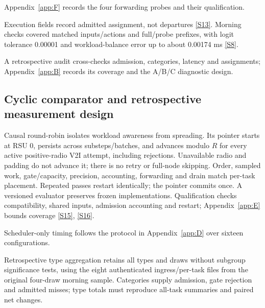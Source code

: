 \documentclass[12pt,a4paper]{article}
\begin{document}
Appendix~\ref{app:F} records the four forwarding probes and their qualification.

Execution fields record admitted assignment, not departures \hyperref[source-s13]{[S13]}. Morning checks covered matched inputs/actions and full/probe prefixes, with logit tolerance 0.00001 and workload-balance error up to about 0.00174 ms \hyperref[source-s8]{[S8]}.

A retrospective audit cross-checks admission, categories, latency and assignments; Appendix~\ref{app:B} records its coverage and the A/B/C diagnostic design.

\FloatBarrier
\subsection{Cyclic comparator and retrospective measurement design}\label{sec:2.8}

Causal round-robin isolates workload awareness from spreading. Its pointer starts at RSU 0, persists across substeps/batches, and advances modulo $R$ for every active positive-radio V2I attempt, including rejections. Unavailable radio and padding do not advance it; there is no retry or full-node skipping. Order, sampled work, gate/capacity, precision, accounting, forwarding and drain match per-task placement. Repeated passes restart identically; the pointer commits once. A versioned evaluator preserves frozen implementations. Qualification checks compatibility, shared inputs, admission accounting and restart; Appendix~\ref{app:E} bounds coverage \hyperref[source-s15]{[S15]}, \hyperref[source-s16]{[S16]}.

Scheduler-only timing follows the protocol in Appendix~\ref{app:D} over sixteen configurations.

Retrospective type aggregation retains all types and draws without subgroup significance tests, using the eight authenticated ingress/per-task files from the original four-draw morning sample. Categories supply admission, gate rejection and admitted misses; type totals must reproduce all-task summaries and paired net changes.

\FloatBarrier
\end{document}
